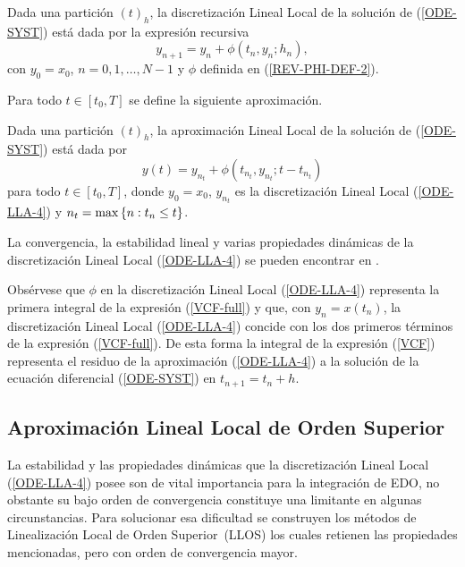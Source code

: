 \begin{definition}
	\label{definition LLD} Dada una partición $(t)_{h}$, la discretización Lineal Local de la solución de (\ref{ODE-SYST}) está dada por la expresión recursiva
	\begin{equation}
	y_{n+1}=y_{n}+\phi \left( t_{n},y_{n};h_{n}\right) ,  \label{ODE-LLA-4}
	\end{equation}%
	con $y_{0}=x_{0}$, $n=0,1,\ldots,N-1$ y $\phi$ definida en (\ref{REV-PHI-DEF-2}).
\end{definition}

Para todo $t\in[t_{0},T]$ se define la siguiente aproximación.
\begin{definition}
	\label{definition LLA} Dada una partición $(t)_{h}$, la aproximación
	Lineal Local de la solución de (\ref{ODE-SYST}) está dada por 
	\begin{equation}
	y(t)=y_{n_{t}}+\phi(t_{n_{t}},y_{n_{t}};t-t_{n_{t}})
	\label{ODE-REV-FORM-LLA}
	\end{equation}
	para todo $t\in[t_{0},T]$, donde $y_{0}=x_{0}$, $y_{n_{t}}$ es la discretización Lineal Local (\ref{ODE-LLA-4}) y ${n_{t}=\max\left\{ n:t_{n}\leq t \right\}}$.
\end{definition}

 La convergencia, la estabilidad lineal y varias propiedades dinámicas de  la discretización Lineal Local (\ref{ODE-LLA-4}) se pueden encontrar en \cite{Jimenez02AMC}. 
 
 Obsérvese que $\phi$ en la discretización Lineal Local (\ref{ODE-LLA-4}) representa la primera integral de la expresión (\ref{VCF-full}) y que, con $y_n=x(t_n)$, la discretización Lineal Local (\ref{ODE-LLA-4}) concide con los dos primeros términos de la expresión (\ref{VCF-full}). De esta forma la integral de la expresión (\ref{VCF}) representa el residuo de la aproximación (\ref{ODE-LLA-4}) a la solución de la ecuación diferencial (\ref{ODE-SYST}) en $t_{n+1}=t_n+h$.
\subsection{Aproximación Lineal Local de Orden Superior}

La estabilidad y las propiedades dinámicas que la discretización Lineal Local (\ref{ODE-LLA-4}) posee son de vital importancia para la integración de EDO, no obstante su bajo orden de convergencia constituye una limitante en algunas circunstancias. Para solucionar esa dificultad se construyen los métodos de Linealización Local de Orden Superior~(LLOS) los cuales retienen las propiedades mencionadas, pero con orden de convergencia mayor. 

